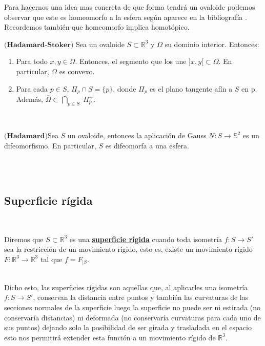 Para hacernos una idea mas concreta de que forma tendrá un ovaloide podemos observar que este es homeomorfo a la esfera según aparece en la bibliografía \cite{ref1}. Recordemos también que homeomorfo implica homotópico.
${ }$\\


\begin{teorema} \label{teo:hadamard}
	$\textbf{(Hadamard-Stoker)}$ Sea un ovaloide $S \subset \mathbb{R}^3$ y $\Omega$ su dominio interior. Entonces:
	
	\begin{enumerate}
		\item Para todo $x, y \in \overline{\Omega}$. Entonces, el segmento que los une $]x, y[ \subset \Omega$. En particular, $\Omega$ es convexo.
		\item Para cada $p \in S$, $\Pi_p \cap S = \{p\}$, donde $\Pi_p$ es el plano tangente afín a $S$ en p. Además, $\overline{\Omega} \subset \bigcap_{p \in S} \; \Pi^{+}_{p}$.
	\end{enumerate}
\end{teorema}
${ }$\\

\begin{teorema}
	$\textbf{(Hadamard)}$Sea $S$ un ovaloide, entonces la aplicación de Gauss $N : S \to \mathbb{S}^2$ es un difeomorfismo. En particular, $S$ es difeomorfa a una esfera.
\end{teorema}
${ }$\\


${ }$\\
\subsection{Superficie rígida}
${ }$\\

\begin{definicion}
	Diremos que $S \subset \mathbb{R}^3$ es una \underline{\textbf{superficie rígida}} cuando toda isometría $f : S \to S'$ sea la restricción de un movimiento rígido, esto es, existe un movimiento rígido $F : \mathbb{R}^3 \to \mathbb{R}^3$ tal que $f = F_{|S}$.
\end{definicion}
${ }$\\

Dicho esto, las superficies rígidas son aquellas que, al aplicarles una isometría $f : S \to S'$, conservan la distancia entre puntos y también las curvaturas de las secciones normales de la superficie luego la superficie no puede ser ni estirada (no conservaría distancias) ni deformada (no conservaría curvaturas para cada uno de sus puntos) dejando solo la posibilidad de ser girada y trasladada en el espacio esto nos permitirá extender esta función a un movimiento rígido de $\mathbb{R}^3$.
${ }$\\



